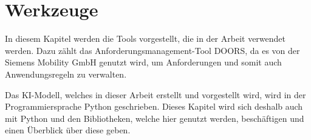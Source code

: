 \chapter{Werkzeuge}
\label{chap:Werkzeuge}
In diesem Kapitel werden die Tools vorgestellt, die in der Arbeit verwendet werden.
Dazu zählt das Anforderungsmanagement-Tool \ac{DOORS}, da es von der Siemens Mobility GmbH genutzt wird, um Anforderungen und somit auch Anwendungsregeln zu verwalten.

Das \ac{KI}-Modell, welches in dieser Arbeit erstellt und vorgestellt wird, wird in der Programmiersprache Python geschrieben.
Dieses Kapitel wird sich deshalb auch mit Python und den Bibliotheken, welche hier genutzt werden, beschäftigen und einen Überblick über diese geben.






